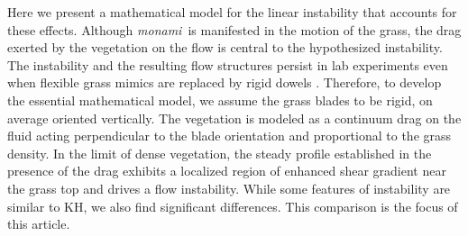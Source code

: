 \documentclass{jfm}
\newcommand{\monami}{\textit{monami}}
\begin{document}
Here we present a mathematical model for the linear instability that accounts for these effects.
Although \monami ~is manifested in the motion of the grass, the drag exerted by the vegetation on the flow is central to the hypothesized instability. 
The instability and the resulting flow structures persist in lab experiments even when flexible grass mimics are replaced by rigid dowels \citep{Ghisal02,Nepf06}. 
Therefore, to develop the essential mathematical model, we assume the grass blades to be rigid, on average oriented vertically.
The vegetation is modeled as a continuum drag on the fluid acting perpendicular to the blade orientation and proportional to the grass density.
In the limit of dense vegetation, the steady profile established in the presence of the drag exhibits a localized region of enhanced shear gradient near the grass top and drives a flow instability.
While some features of instability are similar to KH, we also find significant differences.
This comparison is the focus of this article.

% 
\end{document}

